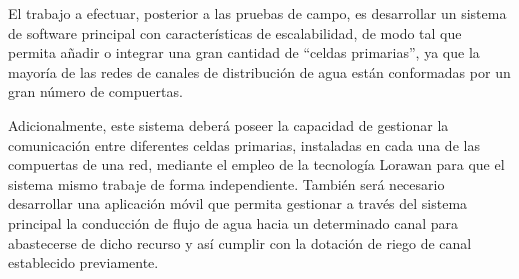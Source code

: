 El trabajo a efectuar, posterior a las pruebas de campo, es desarrollar un sistema de software principal con características de escalabilidad, de modo tal que permita añadir o integrar una gran cantidad de “celdas primarias”, ya que la mayoría de las redes de canales de distribución de agua están conformadas por un gran número de compuertas.

Adicionalmente, este sistema deberá poseer la capacidad de gestionar la comunicación entre diferentes celdas primarias, instaladas en cada una de las compuertas de una red, mediante el empleo de la tecnología Lorawan para que el sistema mismo trabaje de forma independiente. También será necesario desarrollar una aplicación móvil que permita gestionar a través del sistema principal la conducción de flujo de agua hacia un determinado canal para abastecerse de dicho recurso y así cumplir con la dotación de riego de canal establecido previamente.


